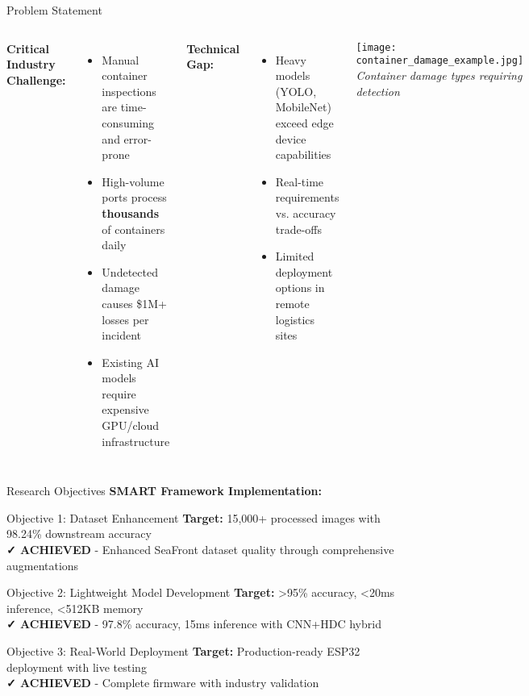 \documentclass[aspectratio=169]{beamer}
\begin{document}
\begin{frame}{Problem Statement}
\begin{columns}
\textbf{Critical Industry Challenge:}
\begin{itemize}
\item Manual container inspections are \textcolor{warningred}{time-consuming} and \textcolor{warningred}{error-prone}
\item High-volume ports process \textbf{thousands} of containers daily
\item Undetected damage causes \textcolor{warningred}{\$1M+} losses per incident
\item Existing AI models require \textcolor{warningred}{expensive GPU/cloud} infrastructure
\end{itemize}

\vspace{0.5cm}
\textbf{Technical Gap:}
\begin{itemize}
\item Heavy models (YOLO, MobileNet) exceed edge device capabilities
\item Real-time requirements vs. accuracy trade-offs
\item Limited deployment options in remote logistics sites
\end{itemize}

\begin{center}
\texttt{[image: container\_damage\_example.jpg]}\\
\small\textit{Container damage types requiring detection}
\end{center}
\end{columns}
\end{frame}

\begin{frame}{Research Objectives}
\textbf{SMART Framework Implementation:}

\vspace{0.3cm}
\begin{block}{Objective 1: Dataset Enhancement}
\textbf{Target:} 15,000+ processed images with 98.24\% downstream accuracy\\
\textcolor{successgreen}{\textbf{✓ ACHIEVED}} - Enhanced SeaFront dataset quality through comprehensive augmentations
\end{block}

\begin{block}{Objective 2: Lightweight Model Development}
\textbf{Target:} >95\% accuracy, <20ms inference, <512KB memory\\
\textcolor{successgreen}{\textbf{✓ ACHIEVED}} - 97.8\% accuracy, 15ms inference with CNN+HDC hybrid
\end{block}

\begin{block}{Objective 3: Real-World Deployment}
\textbf{Target:} Production-ready ESP32 deployment with live testing\\
\textcolor{successgreen}{\textbf{✓ ACHIEVED}} - Complete firmware with industry validation
\end{block}
\end{frame}
\end{document}
